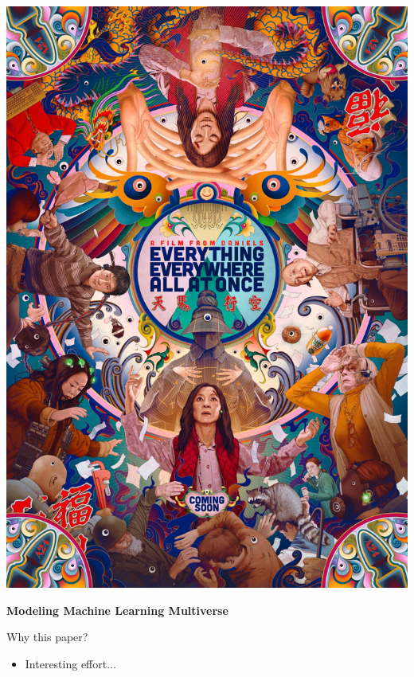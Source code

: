 \documentclass[aspectratio=169]{beamer}
\author{\authorlabel}
\newcommand{\mysubtitle}{\color{Pink}\Large{\textbf{Modeling Machine Learning Multiverse}}}
\begin{document}



\begin{frame}
  \begin{minipage}{0.3\textwidth}
    \centering
    \includegraphics[width=\textwidth]{figures/movie.jpeg}
  \end{minipage}%
  \begin{minipage}{0.7\textwidth}
  \centering
  \mysubtitle\cite{bell2022}
  \end{minipage}

\end{frame}

\begin{frame}{Why this paper?}
  \centering
  \begin{itemize}
    \item Interesting effort...
  \end{itemize}
\end{frame}
\end{document}
